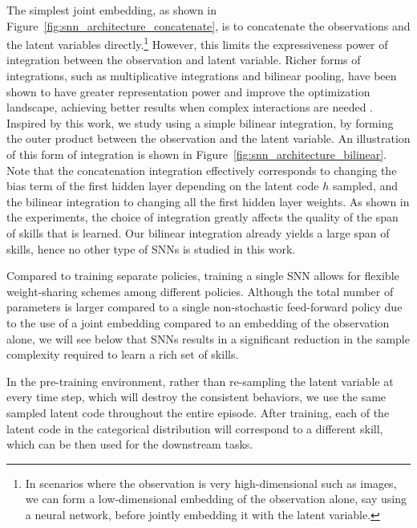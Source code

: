 \documentclass{article} %
\begin{document}
The simplest joint embedding, as shown in Figure~\ref{fig:snn_architecture_concatenate}, is to concatenate the observations and the latent variables directly.\footnote{In scenarios where the observation is very high-dimensional such as images, we can form a low-dimensional embedding of the observation alone, say using a neural network, before jointly embedding it with the latent variable.} However, this limits the expressiveness power of integration between the observation and latent variable. Richer forms of integrations, such as multiplicative integrations and bilinear pooling, have been shown to have greater representation power and improve the optimization landscape, achieving better results when complex interactions are needed \citep{fukui2016multimodal, wu2016multiplicative}. Inspired by this work, we study using a simple bilinear integration, by forming the outer product between the observation and the latent variable. An illustration of this form of integration is shown in Figure~\ref{fig:snn_architecture_bilinear}. Note that the concatenation integration effectively corresponds to changing the bias term of the first hidden layer depending on the latent code $h$ sampled, and the bilinear integration to changing all the first hidden layer weights. As shown in the experiments, the choice of integration greatly affects the quality of the span of skills that is learned. Our bilinear integration already yields a large span of skills, hence no other type of SNNs is studied in this work.


Compared to training separate policies, training a single SNN allows for flexible weight-sharing schemes among different policies. Although the total number of parameters is larger compared to a single non-stochastic feed-forward policy due to the use of a joint embedding compared to an embedding of the observation alone, we will see below that SNNs results in a significant reduction in the sample complexity required to learn a rich set of skills.

In the pre-training environment, rather than re-sampling the latent variable at every time step, which will destroy the consistent behaviors, we use the same sampled latent code throughout the entire episode. After training, each of the latent code in the categorical distribution will correspond to a different skill, which can be then used for the downstream tasks.


\end{document}
